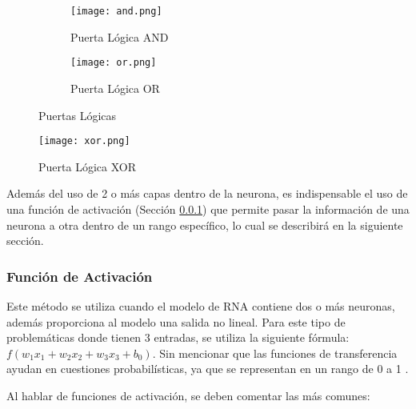         \begin{figure}[H]
            \begin{subfigure}[H]{0.49\textwidth}
                \texttt{[image: and.png]}
                \caption{Puerta Lógica AND}
                \label{fig:and_logic_gate}
            \end{subfigure}
            \hfill
            \begin{subfigure}[H]{0.49\textwidth}
                \texttt{[image: or.png]}
                \caption{Puerta Lógica OR}
                \label{fig:or_logic_gate}
            \end{subfigure}
            \caption{Puertas Lógicas}
            \label{fig:logic_gates}
        \end{figure}

        \begin{figure}[H]
            \centering
            \texttt{[image: xor.png]}
            \caption{Puerta Lógica XOR}
            \label{fig:xor_logic_gate}
        \end{figure}

        Además del uso de 2 o más capas dentro de la neurona, es indispensable el uso de una función de activación (Sección \ref{sec:activation}) que permite pasar la información de una neurona a otra dentro de un rango específico, lo cual se describirá en la siguiente sección.

        \subsubsection{Función de Activación} \label{sec:activation}

        Este método se utiliza cuando el modelo de RNA contiene dos o más neuronas, además proporciona al modelo una salida no lineal. Para este tipo de problemáticas donde tienen 3 entradas, se utiliza la siguiente fórmula: $f(w_1x_1 + w_2x_2 + w_3x_3 + b_0)$. Sin mencionar que las funciones de transferencia ayudan en cuestiones probabilísticas, ya que se representan en un rango de 0 a 1 \cite{renganathan2019}.

        Al hablar de funciones de activación, se deben comentar las más comunes:
        
